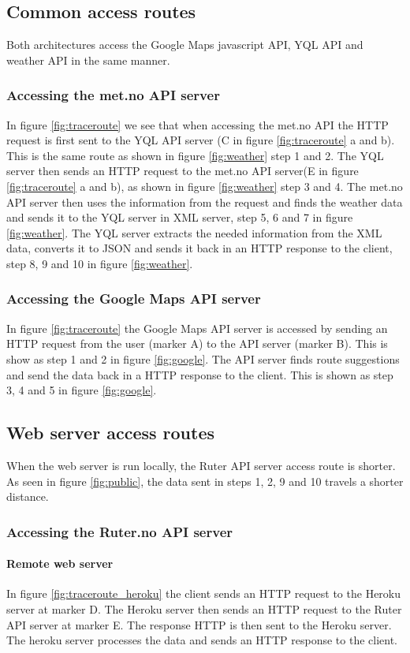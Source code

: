 \documentclass[10pt,a4paper]{article}
\begin{document}
\subsection{Common access routes}
Both architectures access the Google Maps javascript API, YQL API and weather API in the same manner. 

\subsubsection{Accessing the met.no API server}
In figure \ref{fig:traceroute} we see that when accessing the met.no API the HTTP request is first sent to the YQL API server (C in figure \ref{fig:traceroute} a and b). This is the same route as shown in figure \ref{fig:weather} step 1 and 2. The YQL server then sends an HTTP request to the met.no API server(E in figure \ref{fig:traceroute} a and b), as shown in figure \ref{fig:weather} step 3 and 4. The met.no API server then uses the information from the request and finds the weather data and sends it to the YQL server in XML server, step 5, 6 and 7 in figure \ref{fig:weather}. The YQL server extracts the needed information from the XML data, converts it to JSON and sends it back in an HTTP response to the client, step 8, 9 and 10 in figure \ref{fig:weather}.

\subsubsection{Accessing the Google Maps API server}
In figure \ref{fig:traceroute} the Google Maps API server is accessed by sending an HTTP request from the user (marker A) to the API server (marker B). This is show as step 1 and 2 in figure \ref{fig:google}. The API server finds route suggestions and send the data back in a HTTP response to the client. This is shown as step 3, 4 and 5 in figure \ref{fig:google}.

\subsection{Web server access routes}
When the web server is run locally, the Ruter API server access route is shorter. As seen in figure \ref{fig:public}, the data sent in steps 1, 2, 9 and 10 travels a shorter distance. 
\subsubsection{Accessing the Ruter.no API server}
\paragraph{Remote web server}
In figure \ref{fig:traceroute_heroku} the client sends an HTTP request to the Heroku server at marker D. The Heroku server then sends an HTTP request to the Ruter API server at marker E. The response HTTP is then sent to the Heroku server. The heroku server processes the data and sends an HTTP response to the client.
\end{document}
